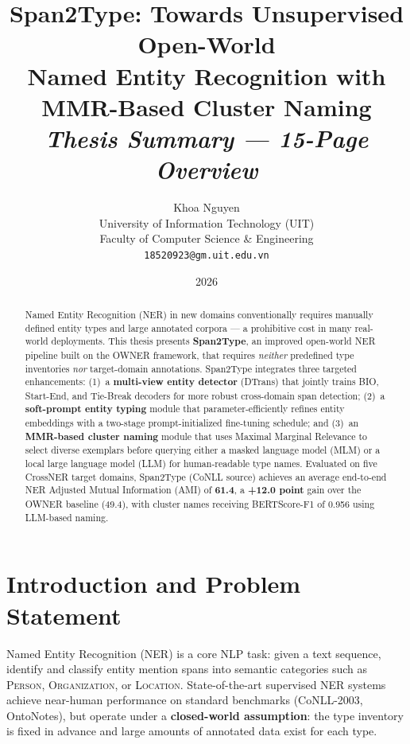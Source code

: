\documentclass[11pt,a4paper]{article}
\title{%
  \textbf{Span2Type: Towards Unsupervised Open-World\\
  Named Entity Recognition with MMR-Based Cluster Naming}\\[6pt]
  \large \textit{Thesis Summary — 15-Page Overview}
}
\author{Khoa Nguyen\\[4pt]
  \small University of Information Technology (UIT)\\
  \small Faculty of Computer Science \& Engineering\\
  \small \texttt{18520923@gm.uit.edu.vn}
}
\date{2026}
\begin{document}
\maketitle
\thispagestyle{empty}

\begin{abstract}
\noindent
Named Entity Recognition (NER) in new domains conventionally requires manually defined entity types and large annotated corpora — a prohibitive cost in many real-world deployments. This thesis presents \textbf{Span2Type}, an improved open-world NER pipeline built on the OWNER framework, that requires \emph{neither} predefined type inventories \emph{nor} target-domain annotations. Span2Type integrates three targeted enhancements: (1)~a \textbf{multi-view entity detector} (DTrans) that jointly trains BIO, Start-End, and Tie-Break decoders for more robust cross-domain span detection; (2)~a \textbf{soft-prompt entity typing} module that parameter-efficiently refines entity embeddings with a two-stage prompt-initialized fine-tuning schedule; and (3)~an \textbf{MMR-based cluster naming} module that uses Maximal Marginal Relevance to select diverse exemplars before querying either a masked language model (MLM) or a local large language model (LLM) for human-readable type names. Evaluated on five CrossNER target domains, Span2Type (CoNLL source) achieves an average end-to-end NER Adjusted Mutual Information (AMI) of \textbf{61.4}, a \textbf{+12.0 point} gain over the OWNER baseline (49.4), with cluster names receiving BERTScore-F1 of 0.956 using LLM-based naming.
\end{abstract}

\tableofcontents
\newpage

\section{Introduction and Problem Statement}

Named Entity Recognition (NER) is a core NLP task: given a text sequence, identify and classify entity mention spans into semantic categories such as \textsc{Person}, \textsc{Organization}, or \textsc{Location}. State-of-the-art supervised NER systems achieve near-human performance on standard benchmarks (CoNLL-2003, OntoNotes), but operate under a \textbf{closed-world assumption}: the type inventory is fixed in advance and large amounts of annotated data exist for each type.
\end{document}
